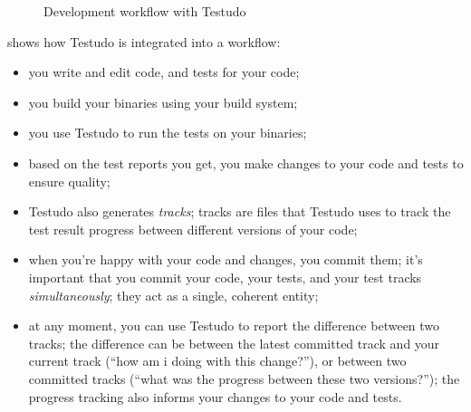 \documentclass[twoside, a4paper, article]{memoir}
\begin{document}
\begin{figure}
  \caption{Development workflow with Testudo}
  \label{fig:workflow}
\end{figure}

 shows how Testudo is integrated into a workflow:
\begin{itemize}
\item you write and edit code, and tests for your code;
\item you build your binaries using your build system;
\item you use Testudo to run the tests on your binaries;
\item based on the test reports you get, you make changes to your code and
  tests to ensure quality;
\item Testudo also generates \emph{tracks}; tracks are files that Testudo uses
  to track the test result progress between different versions of your code;
\item when you're happy with your code and changes, you commit them; it's
  important that you commit your code, your tests, and your test tracks
  \emph{simultaneously}; they act as a single, coherent entity;
\item at any moment, you can use Testudo to report the difference between two
  tracks; the difference can be between the latest committed track and your
  current track (``how am i doing with this change?''), or between two
  committed tracks (``what was the progress between these two versions?''); the
  progress tracking also informs your changes to your code and tests.
\end{itemize}
\end{document}
